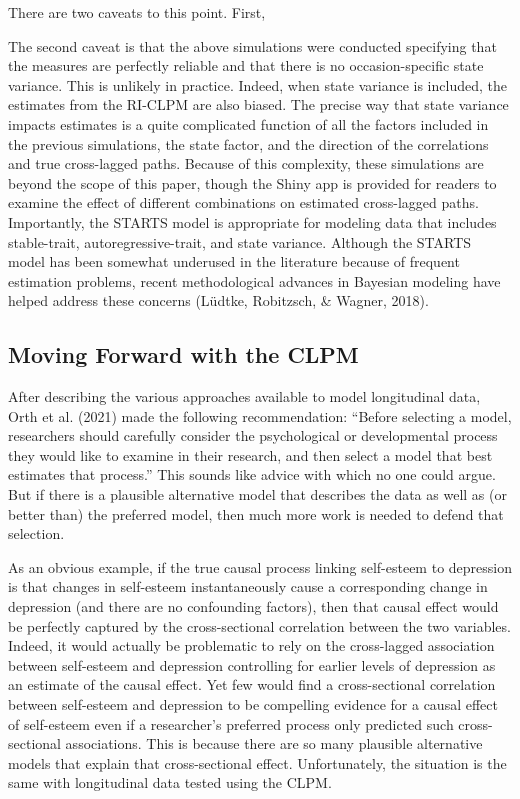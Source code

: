 \documentclass[
  english,
  man,floatsintext]{apa6}
\begin{document}
There are two caveats to this point. First,

The second caveat is that the above simulations were conducted specifying that the measures are perfectly reliable and that there is no occasion-specific state variance. This is unlikely in practice. Indeed, when state variance is included, the estimates from the RI-CLPM are also biased. The precise way that state variance impacts estimates is a quite complicated function of all the factors included in the previous simulations, the state factor, and the direction of the correlations and true cross-lagged paths. Because of this complexity, these simulations are beyond the scope of this paper, though the Shiny app is provided for readers to examine the effect of different combinations on estimated cross-lagged paths. Importantly, the STARTS model is appropriate for modeling data that includes stable-trait, autoregressive-trait, and state variance. Although the STARTS model has been somewhat underused in the literature because of frequent estimation problems, recent methodological advances in Bayesian modeling have helped address these concerns (Lüdtke, Robitzsch, \& Wagner, 2018).

\hypertarget{moving-forward-with-the-clpm}{%
\subsection{Moving Forward with the CLPM}\label{moving-forward-with-the-clpm}}

After describing the various approaches available to model longitudinal data, Orth et al. (2021) made the following recommendation: ``Before selecting a model, researchers should carefully consider the psychological or developmental process they would like to examine in their research, and then select a model that best estimates that process.'' This sounds like advice with which no one could argue. But if there is a plausible alternative model that describes the data as well as (or better than) the preferred model, then much more work is needed to defend that selection.

As an obvious example, if the true causal process linking self-esteem to depression is that changes in self-esteem instantaneously cause a corresponding change in depression (and there are no confounding factors), then that causal effect would be perfectly captured by the cross-sectional correlation between the two variables. Indeed, it would actually be problematic to rely on the cross-lagged association between self-esteem and depression controlling for earlier levels of depression as an estimate of the causal effect. Yet few would find a cross-sectional correlation between self-esteem and depression to be compelling evidence for a causal effect of self-esteem even if a researcher's preferred process only predicted such cross-sectional associations. This is because there are so many plausible alternative models that explain that cross-sectional effect. Unfortunately, the situation is the same with longitudinal data tested using the CLPM.
\end{document}
